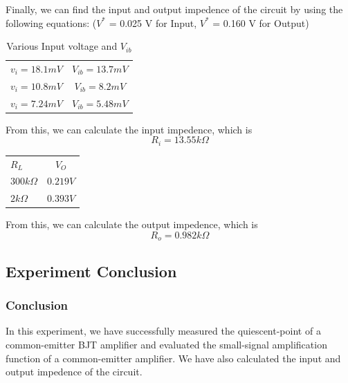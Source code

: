     Finally, we can find the input and output impedence of the circuit by using the following equations:
    ($V^*$ = 0.025 V for Input, $V^*$ = 0.160 V for Output)\par
    \begin{table}[H]
    \centering
        \begin{tabular}{l|c}
        \hline
        $v_i=18.1mV$ & $V_{ib}=13.7mV$ \\
        $v_i=10.8mV$ & $V_{ib}= 8.2mV$  \\
        $v_i=7.24mV$ & $V_{ib}=5.48mV$ \\
        \end{tabular}
        \caption{Various Input voltage and $V_{ib}$}
    \end{table}
    From this, we can calculate the input impedence, which is 
    \begin{equation}
        R_i = 13.55k \Omega
    \end{equation}

    \begin{table}[H]
        \centering
            \begin{tabular}{l|c}
            \hline
            $R_L$ & $V_O$ \\
            $300k \Omega$ & $0.219V$ \\
            $2k \Omega$ & $0.393V$ \\
            \end{tabular}
        \end{table}
    From this, we can calculate the output impedence, which is
    \begin{equation}
        R_o = 0.982k \Omega
    \end{equation}
\subsection{Experiment Conclusion}
    \subsubsection{Conclusion}
    In this experiment, we have successfully measured the quiescent-point of a common-emitter BJT amplifier and evaluated the small-signal amplification function of a common-emitter amplifier. We have also calculated the input and output impedence of the circuit.